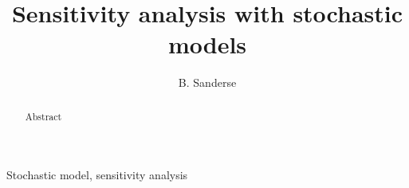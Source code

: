 \documentclass{elsarticle}
\begin{document}
\title{Sensitivity analysis with stochastic models}              %
\author[add1]{B. Sanderse}

\address[add1]{Centrum Wiskunde \& Informatica (CWI), Amsterdam, The Netherlands}



\begin{abstract}
Abstract
\end{abstract}

\begin{keyword}
Stochastic model, sensitivity analysis
\end{keyword}


\maketitle  



\end{document}
